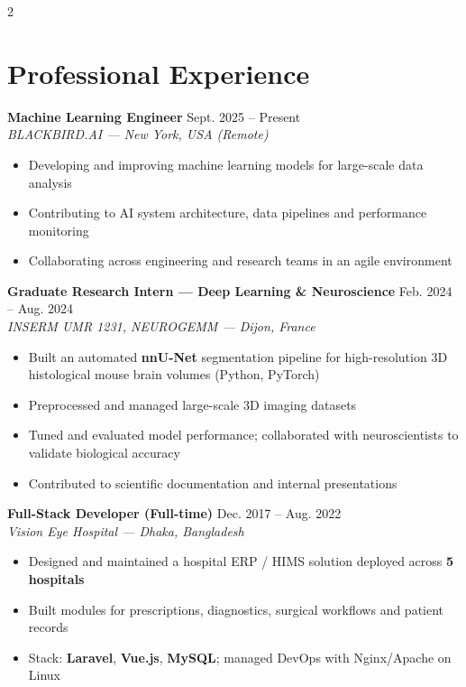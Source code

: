 \documentclass[10pt, a4paper]{article}
\newcommand{\jobtitle}[3]{%
  \textbf{#1} \hfill \textcolor{accent}{\small #3}\\
  \textit{\small\color{graytext}#2}%
}
\begin{document}
\setlength{\columnsep}{14pt}
\begin{paracol}{2}


\section{Professional Experience}

\jobtitle{Machine Learning Engineer}{BLACKBIRD.AI — New York, USA (Remote)}{Sept. 2025 – Present}
\begin{itemize}
  \item Developing and improving machine learning models for large-scale data analysis
  \item Contributing to AI system architecture, data pipelines and performance monitoring
  \item Collaborating across engineering and research teams in an agile environment
\end{itemize}

\vspace{4pt}
\jobtitle{Graduate Research Intern — Deep Learning \& Neuroscience}{INSERM UMR 1231, NEUROGEMM — Dijon, France}{Feb. 2024 – Aug. 2024}
\begin{itemize}
  \item Built an automated \textbf{nnU-Net} segmentation pipeline for high-resolution 3D
        histological mouse brain volumes (Python, PyTorch)
  \item Preprocessed and managed large-scale 3D imaging datasets
  \item Tuned and evaluated model performance; collaborated with neuroscientists to
        validate biological accuracy
  \item Contributed to scientific documentation and internal presentations
\end{itemize}

\vspace{4pt}
\jobtitle{Full-Stack Developer (Full-time)}{Vision Eye Hospital — Dhaka, Bangladesh}{Dec. 2017 – Aug. 2022}
\begin{itemize}
  \item Designed and maintained a hospital ERP / HIMS solution deployed across \textbf{5 hospitals}
  \item Built modules for prescriptions, diagnostics, surgical workflows and patient records
  \item Stack: \textbf{Laravel}, \textbf{Vue.js}, \textbf{MySQL}; managed DevOps with Nginx/Apache on Linux
\end{itemize}


\end{paracol}
\end{document}
